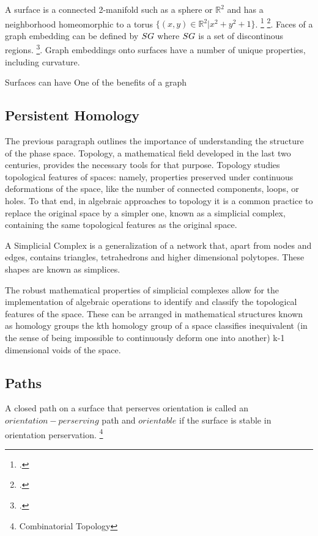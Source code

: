 A surface is a connected 2-manifold such as a sphere or $\mathbb{R}^2$ and has a neighborhood homeomorphic to a torus $\{(x,y) \in \mathbb{R}^2 | x^2 + y^2 + 1\}$. \footcite{Verdiere2016} \footcite{Childs2016}. Faces of a graph embedding can be defined by $S\\G$ where $S\\G$ is a set of discontinous regions. \footcite{Childs2016}. Graph embeddings onto surfaces have a number of unique properties, including curvature.

Surfaces can have One of the benefits of a graph 

\subsection{Persistent Homology}
The previous paragraph outlines the importance of understanding the structure of the phase space. Topology, a mathematical field developed in the last two centuries, provides the necessary tools for that purpose. Topology studies topological features of spaces: namely, properties preserved under continuous deformations of the space, like the number of connected components, loops, or holes. To that end, in algebraic approaches to topology it is a common practice to replace the original space by a simpler one, known as a simplicial complex, containing the same topological features as the original space. 

\begin{definition}
A Simplicial Complex is a generalization of a network that, apart from nodes and edges, contains triangles, tetrahedrons and higher dimensional polytopes. These shapes are known as simplices.
\end{definition}
 The robust mathematical properties of simplicial complexes allow for the implementation of algebraic operations to identify and classify the topological features of the space. These can be arranged in mathematical structures known as homology groups the kth homology group of a space classifies inequivalent (in the sense of being impossible to continuously deform one into another) k-1 dimensional voids of the space.

\subsection{Paths}
A closed path on a surface that perserves orientation is called an $orientation-perserving$ path and $orientable$ if the surface is stable in orientation perservation. \footnote{Combinatorial Topology}

